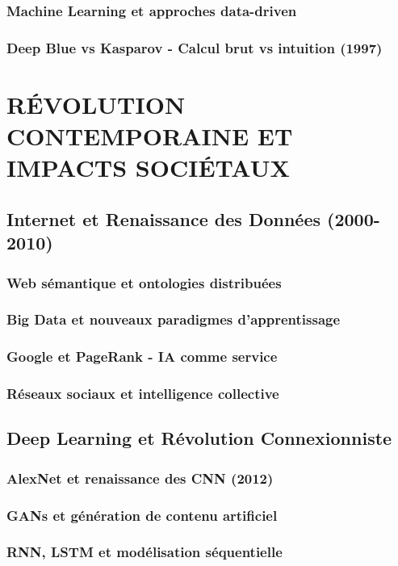 \documentclass[12pt,a4paper]{book}
\begin{document}
\section{Machine Learning et approches data-driven}
\section{Deep Blue vs Kasparov - Calcul brut vs intuition (1997)}

\part{RÉVOLUTION CONTEMPORAINE ET IMPACTS SOCIÉTAUX}
\chapter{Internet et Renaissance des Données (2000-2010)}
\section{Web sémantique et ontologies distribuées}
\section{Big Data et nouveaux paradigmes d'apprentissage}
\section{Google et PageRank - IA comme service}
\section{Réseaux sociaux et intelligence collective}

\chapter{Deep Learning et Révolution Connexionniste}
\section{AlexNet et renaissance des CNN (2012)}
\section{GANs et génération de contenu artificiel}
\section{RNN, LSTM et modélisation séquentielle}
\end{document}
